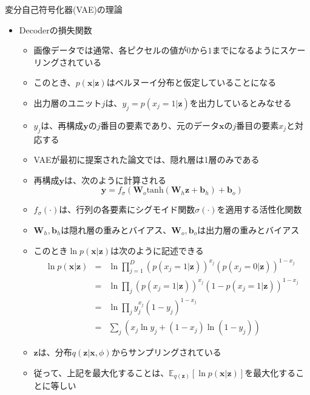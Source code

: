 \documentclass[dvipdfmx,notheorems,t]{beamer}
\begin{document}
\begin{frame}{変分自己符号化器(VAE)の理論}

\begin{itemize}
	\item Decoderの損失関数
	\begin{itemize}
		\item 画像データでは通常、各ピクセルの値が$0$から$1$までになるように\alert{スケーリング}されている
		\item このとき、$p(\bm{x} | \bm{z})$は\alert{ベルヌーイ分布}と仮定していることになる
		\newline
		
		\item 出力層のユニット$j$は、$y_j = p(x_j = 1 | \bm{z})$を出力しているとみなせる
		\item $y_j$は、再構成$\bm{y}$の$j$番目の要素であり、元のデータ$\bm{x}$の$j$番目の要素$x_j$と対応する
		\newline
		\item VAEが最初に提案された論文では、隠れ層は1層のみである
		\item 再構成$\bm{y}$は、次のように計算される
		\begin{equation}
			\bm{y} = f_\sigma \left( \bm{W}_o \mathrm{tanh} \left( \bm{W}_h \bm{z} + \bm{b}_h \right) + \bm{b}_o \right)
		\end{equation}
		\item $f_\sigma(\cdot)$は、行列の各要素にシグモイド関数$\sigma(\cdot)$を適用する活性化関数
		\item $\bm{W}_h, \bm{b}_h$は隠れ層の重みとバイアス、$\bm{W}_o, \bm{b}_o$は出力層の重みとバイアス
		\newline
		
		\item このとき$\ln p(\bm{x} | \bm{z})$は次のように記述できる
		\begin{eqnarray}
			\ln p(\bm{x} | \bm{z}) &=& \ln \prod_{j = 1}^D \left( p(x_j = 1 | \bm{z}) \right)^{x_j} \left( p(x_j = 0 | \bm{z}) \right)^{1 - x_j} \nonumber \\
			&=& \ln \prod_j \left( p(x_j = 1 | \bm{z}) \right)^{x_j} \left( 1 - p(x_j = 1 | \bm{z}) \right)^{1 - x_j} \nonumber \\
			&=& \ln \prod_j y_j^{x_j} \left( 1 - y_j \right)^{1 - x_j} \nonumber \\
			&=& \sum_j \left( x_j \ln y_j + \left( 1 - x_j \right) \ln \left( 1 - y_j \right) \right)
		\end{eqnarray}
		
		\item $\bm{z}$は、分布$q(\bm{z} | \bm{x}, \phi)$からサンプリングされている
		\item 従って、上記を最大化することは、$\mathbb{E}_{q(\bm{z})} \left[ \ln p(\bm{x} | \bm{z}) \right]$を最大化することに等しい
		\newline
		

\end{itemize}
\end{itemize}
\end{frame}
\end{document}
